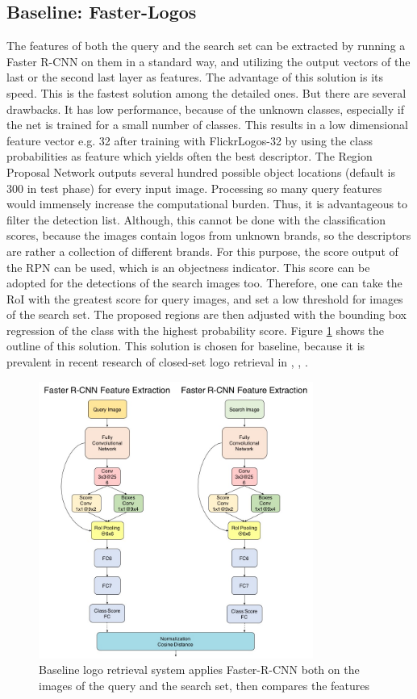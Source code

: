 \subsection{Baseline: Faster-Logos}\label{ss:solution1}
The features of both the query and the search set can be extracted by running a Faster R-CNN on them in a standard way, and utilizing the output vectors of the last or the second last layer as features. The advantage of this solution is its speed. This is the fastest solution among the detailed ones. But there are several drawbacks. It has low performance, because of the unknown classes, especially if the net is trained for a small number of classes. This results in a low dimensional feature vector e.g. 32 after training with FlickrLogos-32 by using the class probabilities as feature which yields often the best descriptor.
\bigbreak
The Region Proposal Network outputs several hundred possible object locations (default is 300 in test phase) for every input image. Processing so many query features would immensely increase the computational burden. Thus, it is advantageous to filter the detection list. Although, this cannot be done with the classification scores, because the images contain logos from unknown brands, so the descriptors are rather a collection of different brands. For this purpose, the score output of the RPN can be used, which is an objectness indicator. This score can be adopted for the detections of the search images too. Therefore, one can take the RoI with the greatest score for query images, and set a low threshold for images of the search set. The proposed regions are then adjusted with the bounding box regression of the class with the highest probability score. Figure \ref{f:sol1arch} shows the outline of this solution. This solution is chosen for baseline, because it is prevalent in recent research of closed-set logo retrieval in \cite{Bao:2016:RCL:3007669.3007728}, \cite{DBLP:journals/corr/OliveiraFPR16}, \cite{DBLP:journals/spl/QiSWX17}.
\begin{figure}
  \centering
  \includegraphics[width=90mm]{images/mt/sol1_arch.jpg}
  \caption{Baseline logo retrieval system applies Faster-R-CNN both on the images of the query and the search set, then compares the features}
  \label{f:sol1arch}
\end{figure}
